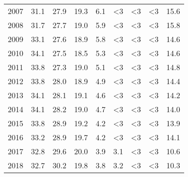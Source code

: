\begin{tabular}{lrrrrrrrr}
2007 &              31.1 &         27.9 &            19.3 &                    6.1 &                  <3 &                 <3 &             <3 &   15.6 \\
2008 &              31.7 &         27.7 &            19.0 &                    5.9 &                  <3 &                 <3 &             <3 &   15.8 \\
2009 &              33.1 &         27.6 &            18.9 &                    5.8 &                  <3 &                 <3 &             <3 &   14.6 \\
2010 &              34.1 &         27.5 &            18.5 &                    5.3 &                  <3 &                 <3 &             <3 &   14.6 \\
2011 &              33.8 &         27.3 &            19.0 &                    5.1 &                  <3 &                 <3 &             <3 &   14.8 \\
2012 &              33.8 &         28.0 &            18.9 &                    4.9 &                  <3 &                 <3 &             <3 &   14.4 \\
2013 &              34.1 &         28.1 &            19.1 &                    4.6 &                  <3 &                 <3 &             <3 &   14.2 \\
2014 &              34.1 &         28.2 &            19.0 &                    4.7 &                  <3 &                 <3 &             <3 &   14.0 \\
2015 &              33.8 &         28.9 &            19.2 &                    4.2 &                  <3 &                 <3 &             <3 &   13.9 \\
2016 &              33.2 &         28.9 &            19.7 &                    4.2 &                  <3 &                 <3 &             <3 &   14.1 \\
2017 &              32.8 &         29.6 &            20.0 &                    3.9 &                 3.1 &                 <3 &             <3 &   10.6 \\
2018 &              32.7 &         30.2 &            19.8 &                    3.8 &                 3.2 &                 <3 &             <3 &   10.3 \\
\bottomrule
\end{tabular}
